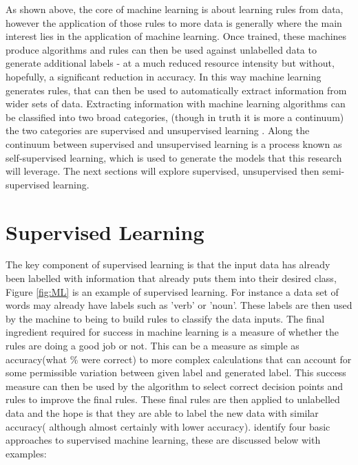 As shown above, the core of machine learning is about learning rules from data, however the application of those rules to more data is generally where the main interest lies in the application of machine learning. Once trained, these machines produce algorithms and rules can then be used against unlabelled data to generate additional labels - at a much reduced resource intensity but without, hopefully, a significant reduction in accuracy. In this way machine learning generates rules, that can then be used to automatically extract information from wider sets of data. Extracting information with machine learning algorithms can be classified into two broad categories, (though in truth it is more a continuum) the two categories are supervised and unsupervised  learning \parencite{chollet_allaire_2018}. Along the continuum  between supervised and unsupervised learning is a process known as self-supervised learning, which is used to generate the models that this research will leverage. The next sections will explore supervised, unsupervised then semi-supervised learning.    


\section{Supervised Learning} The key component of supervised learning is that the input data has already been labelled with information that already puts them into their desired class, Figure \ref{fig:ML} is an example of supervised learning. For instance a data set of words may already have labels such as 'verb' or 'noun'. These labels are then used by the machine to being to build rules to classify the data inputs. The final ingredient required for success in machine learning is a measure of whether the rules are doing a good job or not. This can be a measure as simple as accuracy(what \% were correct) to more complex calculations that can account for some permissible variation between given label and generated label. This success measure can then be used by the algorithm to select correct decision points and rules to improve the final rules. These final rules are then applied to unlabelled data and the hope is that they are able to label the new data with similar accuracy( although almost certainly with lower accuracy).  \textcite{chollet_allaire_2018} identify four basic approaches to supervised machine learning, these are discussed below with examples:

